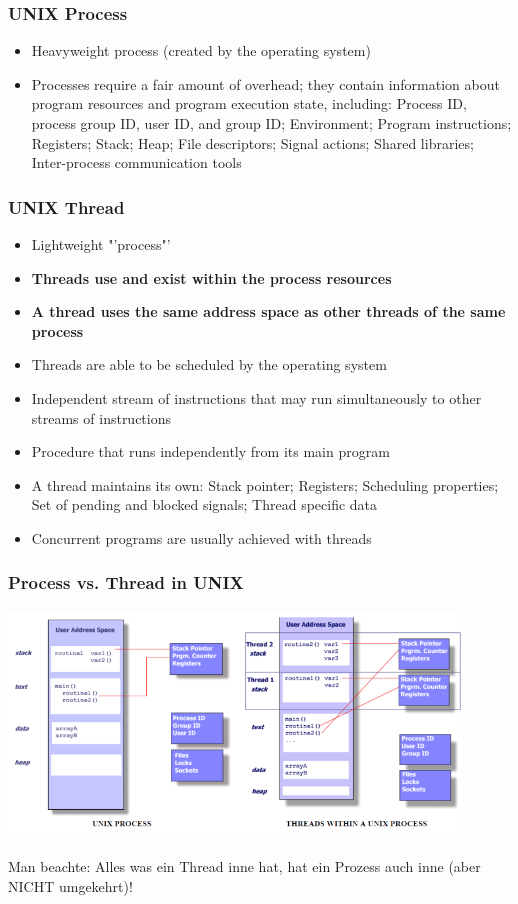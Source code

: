 \subsubsection{UNIX Process}
\begin{itemize}
  \item Heavyweight process (created by the operating system)
  \item Processes require a fair amount of overhead; they contain information about program resources and program execution state, including: Process ID, process group ID, user ID, and group ID; Environment; Program instructions; Registers; Stack; Heap; File descriptors; Signal actions; Shared libraries; Inter-process communication tools
\end{itemize}

\subsubsection{UNIX Thread}
\begin{itemize}
  \item Lightweight "'process"'
  \item \textbf{Threads use and exist within the process resources}
  \item \textbf{A thread uses the same address space as other threads of the same process}
  \item Threads are able to be scheduled by the operating system
  \item Independent stream of instructions that may run simultaneously to other streams of instructions
  \item Procedure that runs independently from its main program
  \item A thread maintains its own: Stack pointer; Registers; Scheduling properties; Set of pending and blocked signals; Thread specific data
  \item Concurrent programs are usually achieved with threads
\end{itemize}

\subsubsection{Process vs. Thread in UNIX}
\includegraphics[width=12cm]{images/Concurrency/ProcessVsThread.png}\\\\
Man beachte: Alles was ein Thread inne hat, hat ein Prozess auch inne (aber NICHT umgekehrt)!

